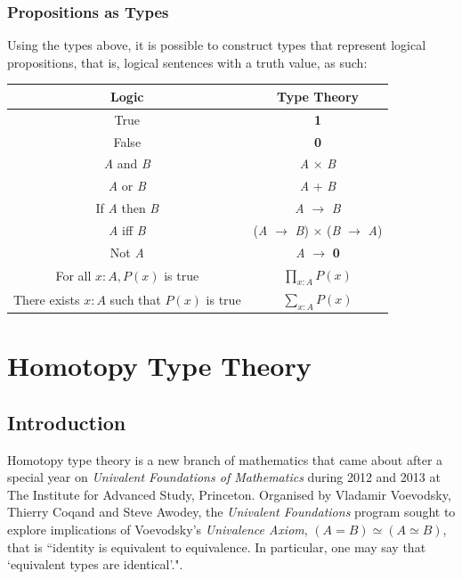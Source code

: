 \documentclass[12pt]{report}
\begin{document}
\subsection{Propositions as Types}
Using the types above, it is possible to construct types that represent logical propositions, that is, logical sentences with a truth value, as such:
\begin{center}
\begin{tabular}{|c|c|}
\hline 
\textbf{Logic} & \textbf{Type Theory} \\ 
\hline
True & \textbf{1} \\ 

False & \textbf{0} \\ 

\textit{A} and \textit{B} & \textit{A} $\times$ \textit{B} \\ 

\textit{A} or \textit{B} & \textit{A} + \textit{B} \\ 

If \textit{A} then \textit{B} & \textit{A} $ \rightarrow $ \textit{B} \\  

\textit{A} iff \textit{B} & (\textit{A} $ \rightarrow $ \textit{B}) $\times$ (\textit{B} $\rightarrow$ \textit{A})  \\ 

Not \textit{A} & \textit{A} $ \rightarrow $ \textbf{0} \\ 

For all $ x : A, P(x)$ is true & $\prod_{x : A}P(x)$\\

There exists $ x : A$ such that $P(x)$ is true & $\sum_{x : A}P(x)$\\

\hline 
\end{tabular} 
\end{center} 

\chapter{Homotopy Type Theory}
\section{Introduction}
Homotopy type theory is a new branch of mathematics that came about after a special year on \textit{Univalent Foundations of Mathematics} during 2012 and 2013 at The Institute for Advanced Study, Princeton. Organised by Vladamir Voevodsky, Thierry Coqand and Steve Awodey, the \textit{Univalent Foundations} program sought to explore implications of Voevodsky's \textit{Univalence Axiom}, $(A = B) \simeq (A \simeq B)$, that is ``identity is equivalent to equivalence. In particular, one may say that `equivalent types are identical'."\cite{hott}.
\end{document}
